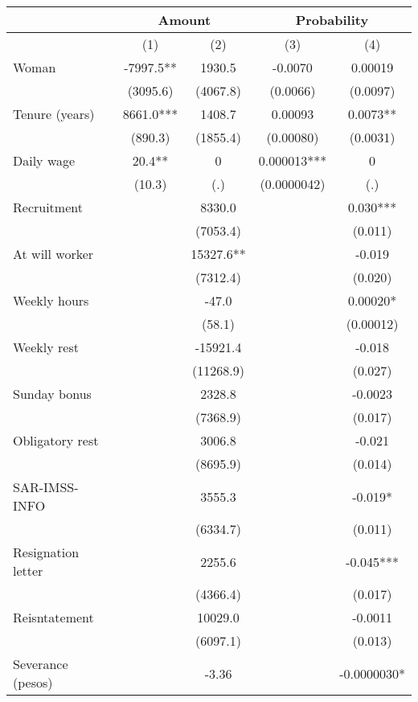 \begin{tabular}{lcccc}
\toprule
      & \multicolumn{2}{c}{Amount } & \multicolumn{2}{c}{Probability} \\
\midrule
\midrule
      & (1)   & (2)   & (3)   & (4) \\
\midrule
\midrule
Woman & -7997.5** & 1930.5 & -0.0070 & 0.00019 \\
      & (3095.6) & (4067.8) & (0.0066) & (0.0097) \\
Tenure (years) & 8661.0*** & 1408.7 & 0.00093 & 0.0073** \\
      & (890.3) & (1855.4) & (0.00080) & (0.0031) \\
Daily wage & 20.4** & 0     & 0.000013*** & 0 \\
      & (10.3) & (.)   & (0.0000042) & (.) \\
Recruitment &       & 8330.0 &       & 0.030*** \\
      &       & (7053.4) &       & (0.011) \\
At will worker &       & 15327.6** &       & -0.019 \\
      &       & (7312.4) &       & (0.020) \\
Weekly hours &       & -47.0 &       & 0.00020* \\
      &       & (58.1) &       & (0.00012) \\
Weekly rest &       & -15921.4 &       & -0.018 \\
      &       & (11268.9) &       & (0.027) \\
Sunday bonus &       & 2328.8 &       & -0.0023 \\
      &       & (7368.9) &       & (0.017) \\
Obligatory rest &       & 3006.8 &       & -0.021 \\
      &       & (8695.9) &       & (0.014) \\
SAR-IMSS-INFO &       & 3555.3 &       & -0.019* \\
      &       & (6334.7) &       & (0.011) \\
Resignation letter &       & 2255.6 &       & -0.045*** \\
      &       & (4366.4) &       & (0.017) \\
Reisntatement &       & 10029.0 &       & -0.0011 \\
      &       & (6097.1) &       & (0.013) \\
Severance (pesos) &       & -3.36 &       & -0.0000030* \\

\end{tabular}

